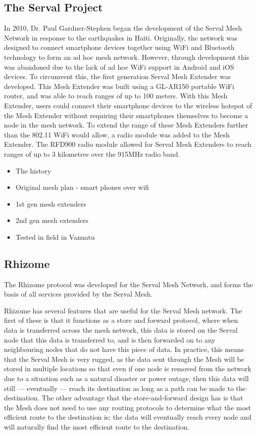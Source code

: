 \subsection{The Serval Project}
In 2010, Dr. Paul Gardner-Stephen began the development of the Serval Mesh Network in response to the earthquakes in Haiti. 
Originally, the network was designed to connect smartphone devices together using WiFi and Bluetooth technology to form an ad hoc mesh network.
However, through development this was abandoned due to the lack of ad hoc WiFi support in Android and iOS devices.
To circumvent this, the first generation Serval Mesh Extender was developed.
This Mesh Extender was built using a GL-AR150 portable WiFi router, and was able to reach ranges of up to 100 meters.
With this Mesh Extender, users could connect their smartphone devices to the wireless hotspot of the Mesh Extender without requiring their smartphones themselves to become a node in the mesh network.
To extend the range of these Mesh Extenders further than the 802.11 WiFi would allow, a radio module was added to the Mesh Extender.
The RFD900 radio module allowed for Serval Mesh Extenders to reach ranges of up to 3 kilometres over the 915MHz radio band.



\begin{itemize}
    \item The history
    \item Original mesh plan - smart phones over wifi
    \item 1st gen mesh extenders
    \item 2nd gen mesh extenders
    \item Tested in field in Vanuatu
\end{itemize}


\subsection{Rhizome}
The Rhizome protocol was developed for the Serval Mesh Network, and forms the basis of all services provided by the Serval Mesh.

Rhizome has several features that are useful for the Serval Mesh network.
The first of these is that it functions as a store and forward protocol, where when data is transferred across the mesh network, this data is stored on the Serval node that this data is transferred to, and is then forwarded on to any neighbouring nodes that do not have this piece of data.
In practice, this means that the Serval Mesh is very rugged, as the data sent through the Mesh will be stored in multiple locations so that even if one node is removed from the network due to a situation such as a natural disaster or power outage, then this data will still — eventually — reach its destination as long as a path can be made to the destination.
The other advantage that the store-and-forward design has is that the Mesh does not need to use any routing protocols to determine what the most efficient route to the destination is; the data will eventually reach every node and will naturally find the most efficient route to the destination.

